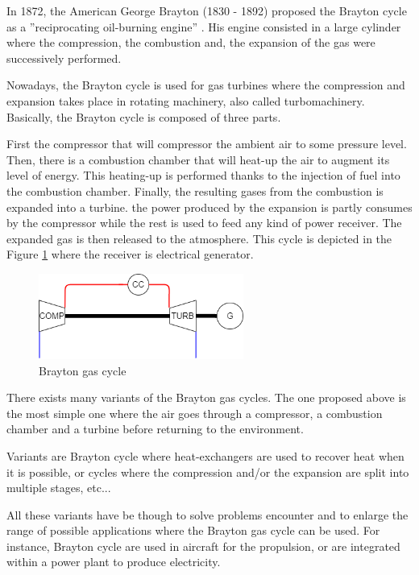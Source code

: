 In 1872, the American George Brayton (1830 - 1892) proposed the Brayton cycle as a ''reciprocating oil-burning engine'' \cite{Boles2006}. His engine consisted in a large cylinder where the compression, the combustion and, the expansion of the gas were successively performed. 

Nowadays, the Brayton cycle is used for gas turbines where the compression and expansion takes place in rotating machinery, also called turbomachinery. Basically, the Brayton cycle is composed of three parts. 

First the compressor that will compressor the ambient air to some pressure level. Then, there is a combustion chamber that will heat-up the air to augment its level of energy. This heating-up is performed thanks to the injection of fuel into the combustion chamber. Finally, the resulting gases from the combustion is expanded into a turbine. the power produced by the expansion is partly consumes by the compressor while the rest is used to feed any kind of power receiver. The expanded gas is then released to the atmosphere. This cycle is depicted in the Figure \ref{fig:C1_GT} where the receiver is electrical generator.

\begin{figure}[h]
    \centering
    \includegraphics[width=0.6\textwidth]{Chapitre_1/Images/GT.png}
    \caption{Brayton gas cycle}
    \label{fig:C1_GT}
\end{figure}
There exists many variants of the Brayton gas cycles. The one proposed above is the most simple one where the air goes through a compressor, a combustion chamber and a turbine before returning to the environment. 

Variants are Brayton cycle where heat-exchangers are used to recover heat when it is possible, or cycles where the compression and/or the expansion are split into multiple stages, etc...

All these variants have be though to solve problems encounter and to enlarge the range of possible applications where the Brayton gas cycle can be used. For instance, Brayton cycle are used in aircraft for the propulsion, or are integrated within a power plant to produce electricity.\\


